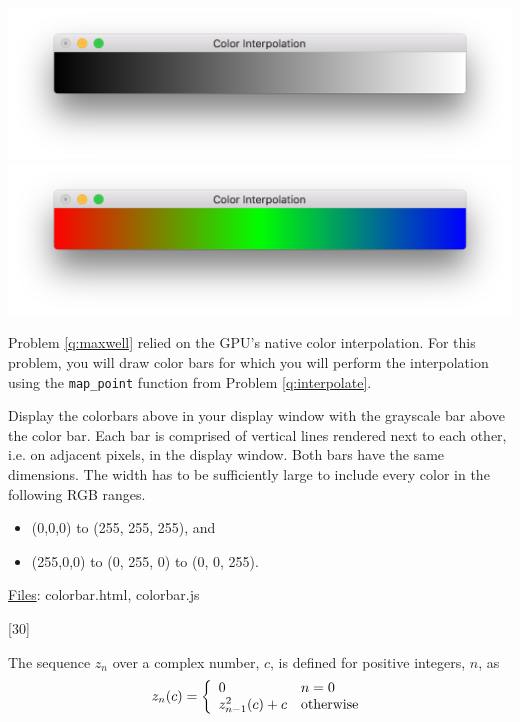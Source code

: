 \documentclass[addpoints]{exam}
\begin{document}
\begin{questions}
  \begin{center}
    \includegraphics[width=\linewidth]{barbw}\\
    \vspace{-75pt}\includegraphics[width=\linewidth]{barrgb}
  \end{center}
  \vspace{-25pt}Problem \ref{q:maxwell} relied on the GPU's native color interpolation. For this problem, you will draw color bars for which you will perform the interpolation using the {\tt map\_point} function from Problem \ref{q:interpolate}.

  Display the colorbars above in your display window with the grayscale bar above the color bar. Each bar is comprised of vertical lines rendered next to each other, i.e. on adjacent pixels, in the display window. Both bars have the same dimensions. The width has to be sufficiently large to include every color in the following RGB ranges.
  \begin{itemize}
  \item (0,0,0) to (255, 255, 255), and
  \item (255,0,0) to (0, 255, 0) to (0, 0, 255).
  \end{itemize}
  \noindent\underline{Files}: {colorbar.html, colorbar.js}

  [30]

  The sequence $z_n$ over a complex number, $c$, is defined for positive integers, $n$, as
  \[
    z_n(c) = \left\{
      \begin{array}{l@{\quad}l}
        0 & n = 0\\
        z^2_{n-1}(c)+c & \textrm{otherwise}
      \end{array}
    \right.
  \]


\end{questions}
\end{document}
